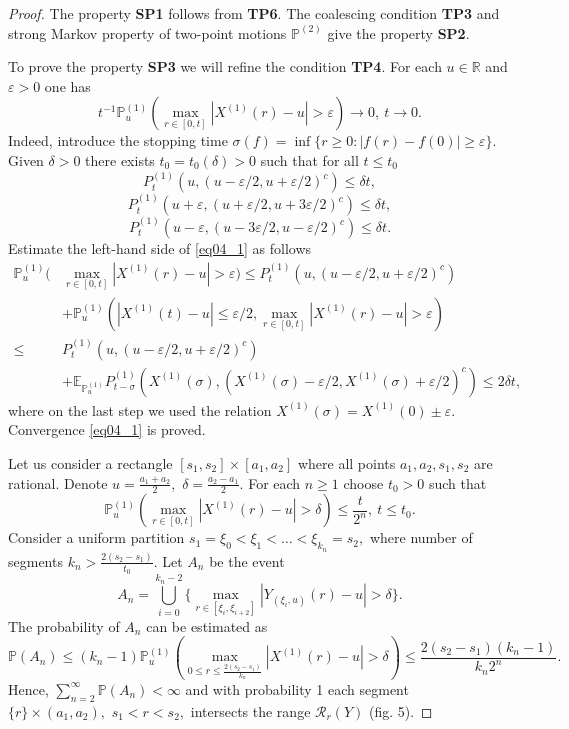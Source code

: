 \documentclass[a4paper,12pt]{article}
\newcommand{\1}{1\!\!\,{\rm I}}
\theoremstyle{plain}
\begin{document}
\begin{proof} The property {\bf SP1} follows from {\bf TP6}. The coalescing condition {\bf TP3} and strong Markov property of two-point motions $\mathbb{P}^{(2)}$ \cite[Ch. 4, Th. 2.7]{EK} give the property {\bf SP2}.
	
	To prove the property {\bf SP3} we  will refine the condition {\bf TP4}. For each $u\in \mathbb{R}$ and $\varepsilon>0$ one has
	\begin{equation}
	\label{eq04_1}
	t^{-1}\mathbb{P}^{(1)}_u (\max_{r\in[0,t]}|X^{(1)}(r)-u|>\varepsilon)\to 0, \ t\to 0.
	\end{equation}
	Indeed, introduce the stopping time $\sigma(f)=\inf\{r\geq 0: |f(r)-f(0)|\geq \varepsilon\}.$ Given $\delta>0$ there exists $t_0=t_0(\delta)>0$ such that for all $t\leq t_0$
	$$
	P^{(1)}_t(u,(u-\varepsilon/2,u+\varepsilon/2)^c)\leq \delta t,
	$$
	$$
	P^{(1)}_t(u+\varepsilon,(u+\varepsilon/2,u+3\varepsilon/2)^c)\leq \delta t,
	$$
	$$
	P^{(1)}_t(u-\varepsilon,(u-3\varepsilon/2,u-\varepsilon/2)^c)\leq \delta t.
	$$
	Estimate the left-hand side of \eqref{eq04_1} as follows
	$$
	\begin{aligned}
	\mathbb{P}^{(1)}_u ( & \max_{r\in[0,t]}|X^{(1)}(r)-u|>\varepsilon)  \leq   P^{(1)}_t(u,(u-\varepsilon/2,u+\varepsilon/2)^c) \\
	& 	+\mathbb{P}^{(1)}_u (|X^{(1)}(t)-u|\leq \varepsilon/2, \max_{r\in[0,t]}|X^{(1)}(r)-u|>\varepsilon)\\ 
	\leq & P^{(1)}_t(u,(u-\varepsilon/2,u+\varepsilon/2)^c) \\
	& +
	\mathbb{E}_{\mathbb{P}^{(1)}_u} P^{(1)}_{t-\sigma}(X^{(1)}(\sigma),(X^{(1)}(\sigma)-\varepsilon/2,X^{(1)}(\sigma)+\varepsilon/2)^c)\leq 2\delta t, 
	\end{aligned}
	$$
	where on the last step we used the relation $X^{(1)}(\sigma)=X^{(1)}(0)\pm\varepsilon.$ Convergence \eqref{eq04_1} is proved.
	
	Let us consider a rectangle $[s_1,s_2]\times [a_1,a_2]$ where all points $a_1,a_2,s_1,s_2$ are rational. Denote $u=\frac{a_1+a_2}{2},$ $\delta=\frac{a_2-a_1}{2}.$ For each $n\geq 1$ choose $t_0>0$ such that 
	$$
	\mathbb{P}^{(1)}_u(\max_{r\in [0,t]}|X^{(1)}(r)-u|>\delta)\leq \frac{t}{2^n}, \ t\leq t_0.
	$$
	Consider a uniform partition  $	s_1=\xi_0<\xi_1<\ldots<\xi_{k_n}=s_2,$ 	where number of segments $k_n>\frac{2(s_2-s_1)}{t_0}.$ Let  $A_n$ be the event
	$$
	A_n=\bigcup^{k_n-2}_{i=0}\{\max_{r\in [\xi_i,\xi_{i+2}]}|Y_{(\xi_i,u)}(r)-u|>\delta\}.
	$$
	The probability of $A_n$ can be estimated as
	$$
	\mathbb{P}(A_n)\leq (k_n-1)\mathbb{P}^{(1)}_u(\max_{0\leq r\leq \frac{2(s_2-s_1)}{k_n}}|X^{(1)}(r)-u|>\delta)\leq \frac{2(s_2-s_1)(k_n-1)}{k_n 2^n}.
	$$
	Hence, $	\sum^\infty_{n=2} \mathbb{P}(A_n)<\infty$ 	and with probability 1 each segment $\{r\}\times (a_1,a_2),$ $s_1<r<s_2,$ intersects the range $\mathcal{R}_r(Y)$ (fig. 5).
	

\end{proof}
\end{document}
